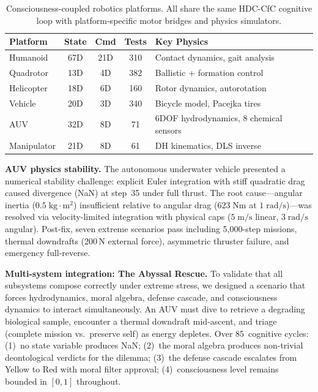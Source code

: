 \documentclass[10pt,letterpaper]{article}
\begin{document}
\begin{table}[ht]
\centering
\caption{Consciousness-coupled robotics platforms. All share the same HDC-CfC cognitive loop with platform-specific motor bridges and physics simulators.}
\label{tab:platforms}
\small
\begin{tabular}{@{}lcccl@{}}
\toprule
Platform & State & Cmd & Tests & Key Physics \\
\midrule
Humanoid & 67D & 21D & 310 & Contact dynamics, gait analysis \\
Quadrotor & 13D & 4D & 382 & Ballistic + formation control \\
Helicopter & 18D & 6D & 160 & Rotor dynamics, autorotation \\
Vehicle & 20D & 3D & 340 & Bicycle model, Pacejka tires \\
AUV & 32D & 8D & 71 & 6DOF hydrodynamics, 8 chemical sensors \\
Manipulator & 21D & 8D & 61 & DH kinematics, DLS inverse \\
\bottomrule
\end{tabular}
\end{table}

\textbf{AUV physics stability.} The autonomous underwater vehicle presented a numerical stability challenge: explicit Euler integration with stiff quadratic drag caused divergence (NaN) at step~35 under full thrust. The root cause---angular inertia ($0.5\;\mathrm{kg \cdot m^2}$) insufficient relative to angular drag ($623\;\mathrm{Nm}$ at $1\;\mathrm{rad/s}$)---was resolved via velocity-limited integration with physical caps ($5\;\mathrm{m/s}$ linear, $3\;\mathrm{rad/s}$ angular). Post-fix, seven extreme scenarios pass including 5{,}000-step missions, thermal downdrafts (200\,N external force), asymmetric thruster failure, and emergency full-reverse.

\textbf{Multi-system integration: The Abyssal Rescue.} To validate that all subsystems compose correctly under extreme stress, we designed a scenario that forces hydrodynamics, moral algebra, defense cascade, and consciousness dynamics to interact simultaneously. An AUV must dive to retrieve a degrading biological sample, encounter a thermal downdraft mid-ascent, and triage (complete mission vs.\ preserve self) as energy depletes. Over 85~cognitive cycles: (1)~no state variable produces NaN; (2)~the moral algebra produces non-trivial deontological verdicts for the dilemma; (3)~the defense cascade escalates from Yellow to Red with moral filter approval; (4)~consciousness level remains bounded in $[0, 1]$ throughout.
\end{document}
